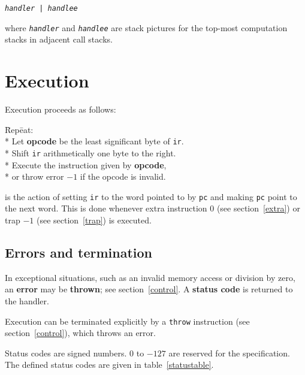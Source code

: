 \documentclass[a4paper]{article}
\newcommand{\spic}[1]{\texttt{\slshape{#1\/}}}
\begin{document}
\begin{center}
  {\tt \spic{handler | handlee}}
\end{center}

\noindent where \spic{handler} and \spic{handlee} are stack pictures for the top-most computation stacks in adjacent call stacks.


\section{Execution}
\label{execution}

Execution proceeds as follows:

\begin{tabbing}
\hspace{0.2in}\=Rep\=eat:\+\+ \\*
Let \textbf{opcode} be the least significant byte of {\tt ir}. \\*
Shift {\tt ir} arithmetically one byte to the right. \\*
Execute the instruction given by \textbf{opcode}, \\*
\hspace{1em}or throw error $-1$ if the opcode is invalid. \-
\end{tabbing}

 is the action of setting {\tt ir} to the word pointed to by {\tt pc} and making {\tt pc} point to the next word. This is done whenever extra instruction $0$ (see section~\ref{extra}) or trap $-1$ (see section~\ref{trap}) is executed.


\subsection{Errors and termination}
\label{errors}

In exceptional situations, such as an invalid memory access or division by zero, an {\bf error} may be {\bf thrown}; see section~\ref{control}. A {\bf status code} is returned to the handler.

Execution can be terminated explicitly by a {\tt throw} instruction (see section~\ref{control}), which throws an error.

Status codes are signed numbers. $0$ to $-127$ are reserved for the specification. The defined status codes are given in table~\ref{statustable}.
\end{document}
